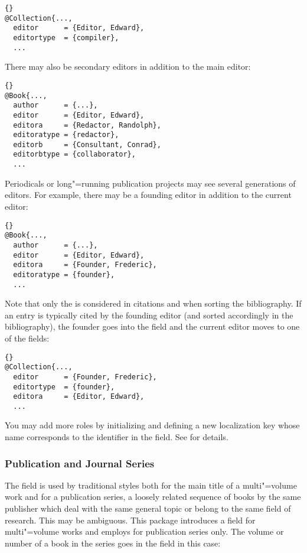 \documentclass{ltxdockit}[2011/03/25]
\begin{document}
\begin{lstlisting}[style=bibtex]{}
@Collection{...,
  editor      = {Editor, Edward},
  editortype  = {compiler},
  ...
\end{lstlisting}
%
There may also be secondary editors in addition to the main editor:

\begin{lstlisting}[style=bibtex]{}
@Book{...,
  author      = {...},
  editor      = {Editor, Edward},
  editora     = {Redactor, Randolph},
  editoratype = {redactor},
  editorb     = {Consultant, Conrad},
  editorbtype = {collaborator},
  ...
\end{lstlisting}
%
Periodicals or long"=running publication projects may see several generations of editors. For example, there may be a founding editor in addition to the current editor:

\begin{lstlisting}[style=bibtex]{}
@Book{...,
  author      = {...},
  editor      = {Editor, Edward},
  editora     = {Founder, Frederic},
  editoratype = {founder},
  ...
\end{lstlisting}
%
Note that only the  is considered in citations and when sorting the bibliography. If an entry is typically cited by the founding editor (and sorted accordingly in the bibliography), the founder goes into the  field and the current editor moves to one of the  fields:

\begin{lstlisting}[style=bibtex]{}
@Collection{...,
  editor      = {Founder, Frederic},
  editortype  = {founder},
  editora     = {Editor, Edward},
  ...
\end{lstlisting}
%
You may add more roles by initializing and defining a new localization key whose name corresponds to the identifier in the  field. See  for details. 

\subsubsection{Publication and Journal Series}
\label{bib:use:ser}

The  field is used by traditional \bibtex styles both for the main title of a multi"=volume work and for a publication series, \ie a loosely related sequence of books by the same publisher which deal with the same general topic or belong to the same field of research. This may be ambiguous. This package introduces a  field for multi"=volume works and employs  for publication series only. The volume or number of a book in the series goes in the  field in this case:
\end{document}
